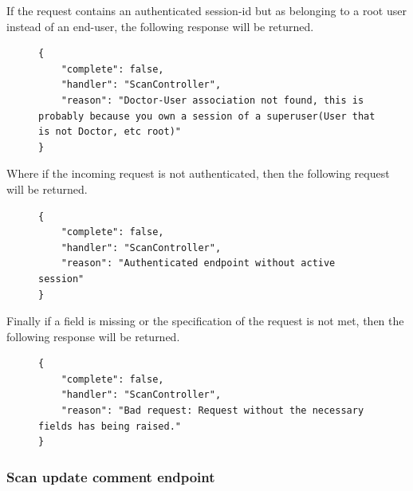 					If the request contains an authenticated session-id but as belonging to a root user instead of an end-user, the following response will be returned.
					\begin{figure}[H]
						\iftrue
						\begin{lstlisting}[]
{
	"complete": false,
	"handler": "ScanController",
	"reason": "Doctor-User association not found, this is probably because you own a session of a superuser(User that is not Doctor, etc root)"
}
						\end{lstlisting}
					\end{figure}
					Where if the incoming request is not authenticated, then the following request will be returned.
					\begin{figure}[H]
						\iftrue
						\begin{lstlisting}[]
{
	"complete": false,
	"handler": "ScanController",
	"reason": "Authenticated endpoint without active session"
}
						\end{lstlisting}
					\end{figure}
					Finally if a field is missing or the specification of the request is not met, then the following response will be returned.
					\begin{figure}[H]
						\iftrue
						\begin{lstlisting}[]
{
	"complete": false,
	"handler": "ScanController",
	"reason": "Bad request: Request without the necessary fields has being raised."
}					
						\end{lstlisting}
					\end{figure}
				\subsubsection{Scan update comment endpoint}
					
